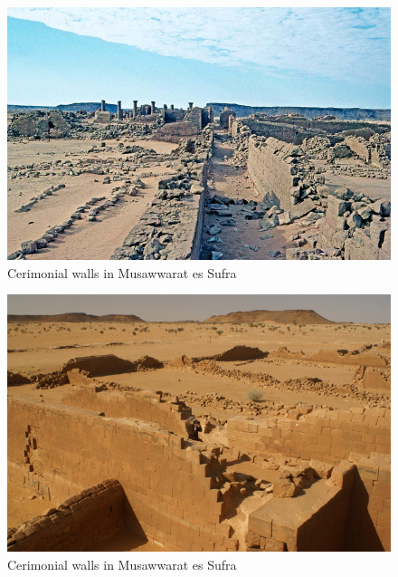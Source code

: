 \documentclass[a4paper,12pt]{scrreprt}
\begin{document}
\begin{figure}[H]
	\centering
	\includegraphics[width=\textwidth]{img/walls_gates/impression_of_wall}
	\caption{Cerimonial walls in Musawwarat es Sufra }
\end{figure}

\begin{figure}[H]
	\centering
	\includegraphics[width=\textwidth]{img/walls_gates/cermonial_wall}
	\caption{Cerimonial walls in Musawwarat es Sufra}
\end{figure}
\end{document}
